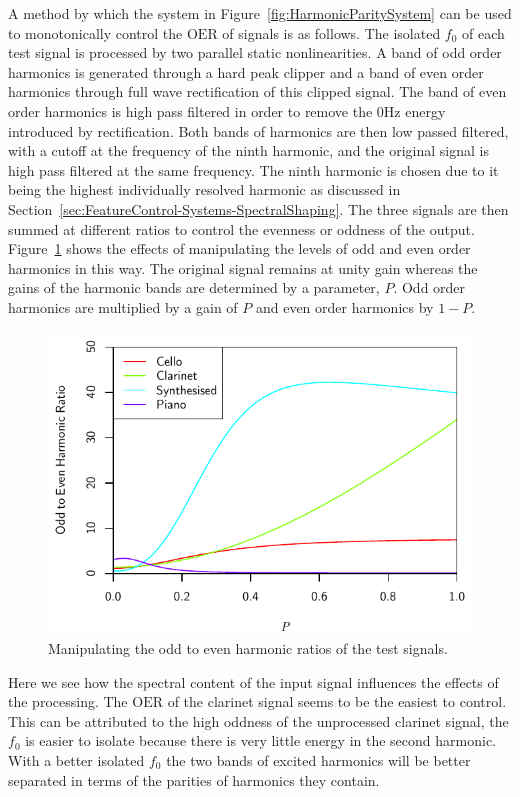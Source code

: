 		A method by which the system in Figure~\ref{fig:HarmonicParitySystem} can be used to monotonically control
		the $\mathrm{OER}$ of signals is as follows. The isolated $f_{0}$ of each test signal is processed by two
		parallel static nonlinearities. A band of odd order harmonics is generated through a hard peak clipper and
		a band of even order harmonics through full wave rectification of this clipped signal. The band of even
		order harmonics is high pass filtered in order to remove the 0Hz energy introduced by rectification.  Both
		bands of harmonics are then low passed filtered, with a cutoff at the frequency of the ninth harmonic, and
		the original signal is high pass filtered at the same frequency. The ninth harmonic is chosen due to it
		being the highest individually resolved harmonic as discussed in
		Section~\ref{sec:FeatureControl-Systems-SpectralShaping}. The three signals are then summed at different
		ratios to control the evenness or oddness of the output.  Figure~\ref{fig:MoveParities} shows the effects
		of manipulating the levels of odd and even order harmonics in this way. The original signal remains at
		unity gain whereas the gains of the harmonic bands are determined by a parameter, $P$.  Odd order harmonics
		are multiplied by a gain of $P$ and even order harmonics by $1 - P$.

		\begin{figure}[h!]
			\centering
			\includegraphics{chapter6/Images/MoveParities.pdf}
			\caption{Manipulating the odd to even harmonic ratios of the test signals.}
			\label{fig:MoveParities}
		\end{figure}

		Here we see how the spectral content of the input signal influences the effects of the processing.  The
		$\mathrm{OER}$ of the clarinet signal seems to be the easiest to control. This can be attributed to the
		high oddness of the unprocessed clarinet signal, the $f_{0}$ is easier to isolate because there is very
		little energy in the second harmonic. With a better isolated $f_{0}$ the two bands of excited harmonics
		will be better separated in terms of the parities of harmonics they contain.

